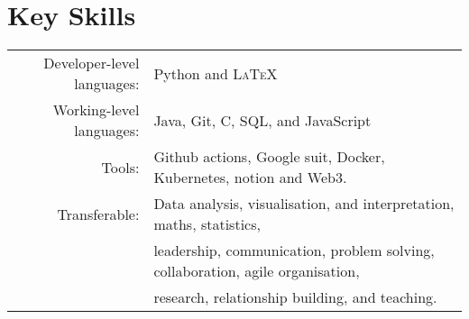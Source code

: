 \documentclass[a4paper,10pt]{article}
\begin{document}
\vspace{-0.05 in}

\section{Key Skills}
\begin{tabular}{rl}
	Developer-level languages: &  Python and \textsc{LaTeX}\\
	Working-level languages: & Java, Git, C, SQL, and JavaScript\\
	Tools: & Github actions, Google suit, Docker, Kubernetes, notion and Web3.\\
	Transferable: & Data analysis, visualisation, and interpretation, maths, statistics,\\ 
	& leadership, communication, problem solving, collaboration, agile organisation,\\ 
	& research, relationship building, and teaching. 	
\end{tabular}
\vspace{-0.05 in}
\end{document}

